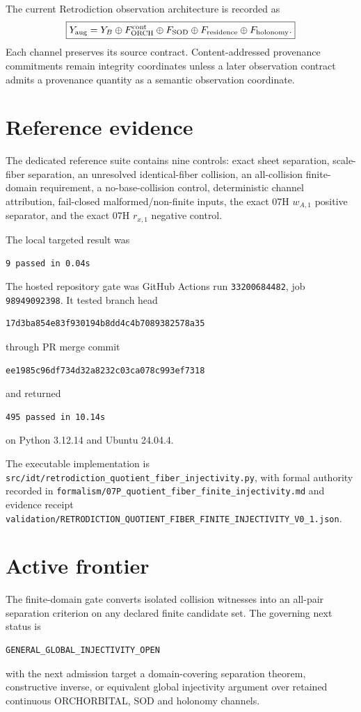 \documentclass[11pt]{book}
\begin{document}
The current Retrodiction observation architecture is recorded as
\[
\boxed{
Y_{\rm aug}
=
Y_B
\oplus F_{\rm ORCH}^{\rm cont}
\oplus F_{\rm SOD}
\oplus F_{\rm residence}
\oplus F_{\rm holonomy}.
}
\]
Each channel preserves its source contract.  Content-addressed provenance commitments remain integrity coordinates unless a later observation contract admits a provenance quantity as a semantic observation coordinate.

\section{Reference evidence}

The dedicated reference suite contains nine controls: exact sheet separation, scale-fiber separation, an unresolved identical-fiber collision, an all-collision finite-domain requirement, a no-base-collision control, deterministic channel attribution, fail-closed malformed/non-finite inputs, the exact 07H $w_{A,1}$ positive separator, and the exact 07H $r_{x,1}$ negative control.

The local targeted result was
\begin{verbatim}
9 passed in 0.04s
\end{verbatim}

The hosted repository gate was GitHub Actions run \texttt{33200684482}, job \texttt{98949092398}.  It tested branch head
\begin{verbatim}
17d3ba854e83f930194b8dd4c4b7089382578a35
\end{verbatim}
through PR merge commit
\begin{verbatim}
ee1985c96df734d32a8232c03ca078c993ef7318
\end{verbatim}
and returned
\begin{verbatim}
495 passed in 10.14s
\end{verbatim}
on Python 3.12.14 and Ubuntu 24.04.4.

The executable implementation is
\texttt{src/idt/retrodiction\_quotient\_fiber\_injectivity.py},
with formal authority recorded in
\texttt{formalism/07P\_quotient\_fiber\_finite\_injectivity.md}
and evidence receipt
\texttt{validation/RETRODICTION\_QUOTIENT\_FIBER\_FINITE\_INJECTIVITY\_V0\_1.json}.

\section{Active frontier}

The finite-domain gate converts isolated collision witnesses into an all-pair separation criterion on any declared finite candidate set.  The governing next status is
\begin{verbatim}
GENERAL_GLOBAL_INJECTIVITY_OPEN
\end{verbatim}
with the next admission target a domain-covering separation theorem, constructive inverse, or equivalent global injectivity argument over retained continuous ORCHORBITAL, SOD and holonomy channels.
\end{document}
